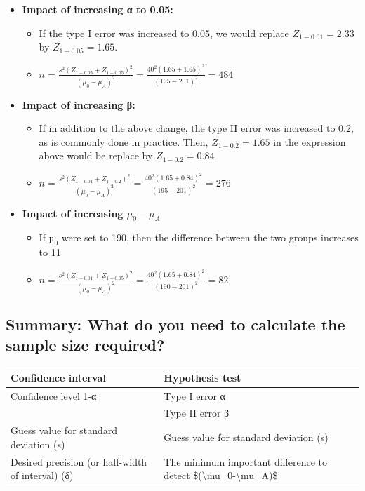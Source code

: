 \documentclass[
]{book}
\providecommand{\tightlist}{%
  \setlength{\itemsep}{0pt}\setlength{\parskip}{0pt}}
\begin{document}
\begin{itemize}
\tightlist
\item
  \textbf{Impact of increasing α to 0.05:}

  \begin{itemize}
  \tightlist
  \item
    If the type I error was increased to 0.05, we would replace \(Z_{1-0.01} = 2.33\) by \(Z_{1-0.05} = 1.65\).
  \item
    \(n = \frac{s^2(Z_{1-0.05}+Z_{1-0.05})^2}{(\mu_0-\mu_A)^2}=\frac{40^2(1.65+1.65)^2}{(195-201)^2}=484\)
  \end{itemize}
\item
  \textbf{Impact of increasing β:}

  \begin{itemize}
  \tightlist
  \item
    If in addition to the above change, the type II error was increased to 0.2, as is commonly done in practice. Then, \(Z_{1-0.2} = 1.65\) in the expression above would be replace by \(Z_{1-0.2} = 0.84\)
  \item
    \(n = \frac{s^2(Z_{1-0.01}+Z_{1-0.2})^2}{(\mu_0-\mu_A)^2}=\frac{40^2(1.65+0.84)^2}{(195-201)^2}=276\)
  \end{itemize}
\item
  \textbf{Impact of increasing \(\mu_0-\mu_A\)}

  \begin{itemize}
  \tightlist
  \item
    If \(µ_0\) were set to 190, then the difference between the two groups increases to 11
  \item
    \(n = \frac{s^2(Z_{1-0.01}+Z_{1-0.05})^2}{(\mu_0-\mu_A)^2}=\frac{40^2(1.65+0.84)^2}{(190-201)^2}=82\)
  \end{itemize}
\end{itemize}

\hypertarget{summary-what-do-you-need-to-calculate-the-sample-size-required}{%
\subsection{Summary: What do you need to calculate the sample size required?}\label{summary-what-do-you-need-to-calculate-the-sample-size-required}}

\begin{tabular}{l|l}
\hline
Confidence interval & Hypothesis test\\
\hline
Confidence level 1-α & Type I error α\\
\hline
 & Type II error β\\
\hline
Guess value for standard deviation (s) & Guess value for standard deviation (s)\\
\hline
Desired precision (or half-width of interval) (δ) & The minimum important difference to detect \$(\textbackslash{}mu\_0-\textbackslash{}mu\_A)\$\\
\hline
\end{tabular}
\end{document}
